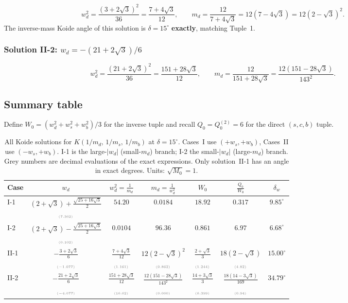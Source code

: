 \documentclass[11pt]{article}
\begin{document}
\[
  w_d^2 = \frac{(3+2\sqrt3)^2}{36} = \frac{7+4\sqrt3}{12},
  \qquad
  m_d = \frac{12}{7+4\sqrt3} = 12(7-4\sqrt3) = 12(2-\sqrt3)^2.
\]
The inverse-mass Koide angle of this solution is
$\delta = 15^\circ$ \textbf{exactly}, matching Tuple~1.

\subsubsection{Solution II-2: $w_d = -(21+2\sqrt3)/6$}

\[
  w_d^2 = \frac{(21+2\sqrt3)^2}{36} = \frac{151+28\sqrt3}{12},
  \qquad
  m_d = \frac{12}{151+28\sqrt3} = \frac{12(151-28\sqrt3)}{143^2}.
\]

\subsection{Summary table}

Define $W_0 = (w_d^2+w_s^2+w_b^2)/3$ for the inverse tuple and
recall $Q_0 = Q_0^{(2)} = 6$ for the direct $(s,c,b)$ tuple.

\newcommand{\dec}[1]{{\scriptscriptstyle\color{gray}(#1)}}

\begin{table}[h]
\centering
\small
\begin{tabular}{@{}l c c c c c c@{}}
\toprule
Case & $w_d$ & $w_d^2=\frac{1}{m_d}$ & $m_d=\frac{1}{w_d^2}$ & $W_0$ & $\frac{Q_0}{W_0}$ & $\delta_w$ \\
\midrule
I-1 & $(2\!+\!\sqrt3)+\frac{\sqrt{25\!+\!16\sqrt3}}{2}$ &
  $54.20$ & $0.0184$ &
  $18.92$ & $0.317$ & $9.85^\circ$ \\
  & $\dec{7.362}$ & & & & & \\[4pt]
I-2 & $(2\!+\!\sqrt3)-\frac{\sqrt{25\!+\!16\sqrt3}}{2}$ &
  $0.0104$ & $96.36$ &
  $0.861$ & $6.97$ & $6.68^\circ$ \\
  & $\dec{0.102}$ & & & & & \\[4pt]
II-1 & $\displaystyle -\frac{3+2\sqrt3}{6}$ &
  $\displaystyle\frac{7+4\sqrt3}{12}$ &
  $12(2\!-\!\sqrt3)^2$ &
  $\displaystyle\frac{2+\sqrt3}{3}$ &
  $18(2\!-\!\sqrt3)$ &
  $\mathbf{15.00}^\circ$ \\
  & $\dec{-1.077}$ & $\dec{1.161}$ & $\dec{0.862}$ & $\dec{1.244}$ & $\dec{4.82}$ & \\[4pt]
II-2 & $\displaystyle -\frac{21+2\sqrt3}{6}$ &
  $\displaystyle\frac{151+28\sqrt3}{12}$ &
  $\displaystyle\frac{12(151\!-\!28\sqrt3)}{143^2}$ &
  $\displaystyle\frac{14+3\sqrt3}{3}$ &
  $\displaystyle\frac{18(14\!-\!3\sqrt3)}{169}$ &
  $34.79^\circ$ \\
  & $\dec{-4.077}$ & $\dec{16.62}$ & $\dec{0.060}$ & $\dec{6.399}$ & $\dec{0.94}$ & \\[2pt]
\bottomrule
\end{tabular}
\caption{All Koide solutions for $K(1/m_d,\,1/m_s,\,1/m_b)$ at $\delta=15^\circ$.
  Cases~I use $(+w_s,+w_b)$, Cases~II use $(-w_s,+w_b)$.
  I-1 is the large-$|w_d|$ (small-$m_d$) branch; I-2 the small-$|w_d|$
  (large-$m_d$) branch.
  Grey numbers are decimal evaluations of the exact expressions.
  Only solution~II-1 has an angle in exact degrees.
  Units: $\sqrt{M_0}=1$.}
\label{tab:inverse-solutions}
\end{table}
\end{document}
